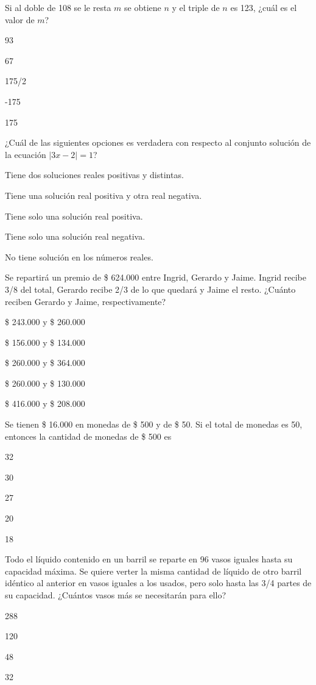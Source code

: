 \documentclass{sn-guia}
\begin{document}
\begin{problemas}
    \problema Si al doble de 108 se le resta $m$ se obtiene $n$ y el triple de $n$ es 123,
    ¿cuál es el valor de $m$?
    \begin{alternativas}[]
        \item 93
        \item 67
        \item 175/2
        \item -175
        \item 175
    \end{alternativas}
    \problema ¿Cuál de las siguientes opciones es verdadera con respecto al conjunto solución
    de la ecuación $|3x-2|=1$?
    \begin{alternativas}[]
        \item Tiene dos soluciones reales positivas y distintas.
        \item Tiene una solución real positiva y otra real negativa.
        \item Tiene solo una solución real positiva.
        \item Tiene solo una solución real negativa.
        \item No tiene solución en los números reales.
    \end{alternativas}
    \problema Se repartirá un premio de \$ 624.000 entre Ingrid, Gerardo y Jaime. Ingrid
    recibe 3/8 del total, Gerardo recibe 2/3 de lo que quedará y Jaime el resto.
    ¿Cuánto reciben Gerardo y Jaime, respectivamente?
    \begin{alternativas}[]
        \item \$ 243.000 y \$ 260.000
        \item \$ 156.000 y \$ 134.000
        \item \$ 260.000 y \$ 364.000
        \item \$ 260.000 y \$ 130.000
        \item \$ 416.000 y \$ 208.000
    \end{alternativas}
    \problema Se tienen \$ 16.000 en monedas de \$ 500 y de \$ 50. Si el total de monedas 
    es 50, entonces la cantidad de monedas de \$ 500 es
    \begin{alternativas}[]
        \item 32
        \item 30
        \item 27
        \item 20
        \item 18
    \end{alternativas}
    \problema Todo el líquido contenido en un barril se reparte en 96 vasos iguales 
    hasta su capacidad máxima. Se quiere verter la misma cantidad de líquido de otro 
    barril idéntico al anterior en vasos iguales a los usados, pero solo hasta las 
    3/4 partes de su capacidad. ¿Cuántos vasos más se necesitarán para ello? 
    \begin{alternativas}[]
        \item 288
        \item 120
        \item 48
        \item 32
    \end{alternativas}


\end{problemas}
\end{document}
